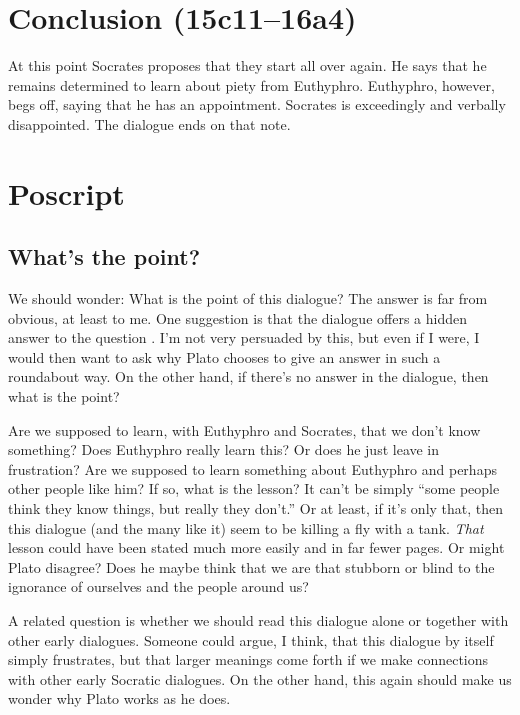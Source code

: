 \documentclass[11pt]{article}
\begin{document}
\section{Conclusion (15c11--16a4)}

At this point Socrates proposes that they start all over again.  He says that he remains determined to learn about piety from Euthyphro.  Euthyphro, however, begs off, saying that he has an appointment.  Socrates is exceedingly and verbally disappointed.  The dialogue ends on that note.


\section{Poscript}

\subsection{What's the point?}

We should wonder: What is the point of this dialogue?  The answer is far from obvious, at least to me.  One suggestion is that the dialogue offers a hidden answer to the question .  I'm not very persuaded by this, but even if I were, I would then want to ask why Plato chooses to give an answer in such a roundabout way.  On the other hand, if there's no answer in the dialogue, then what is the point?

Are we supposed to learn, with Euthyphro and Socrates, that we don't know something?  Does Euthyphro really learn this?  Or does he just leave in frustration?  Are we supposed to learn something about Euthyphro and perhaps other people like him?  If so, what is the lesson?  It can't be simply ``some people think they know things, but really they don't.''  Or at least, if it's only that, then this dialogue (and the many like it) seem to be killing a fly with a tank.  \emph{That} lesson could have been stated much more easily and in far fewer pages.  Or might Plato disagree?  Does he maybe think that we are that stubborn or blind to the ignorance of ourselves and the people around us?

A related question is whether we should read this dialogue alone or together with other early dialogues.  Someone could argue, I think, that this dialogue by itself simply frustrates, but that larger meanings come forth if we make connections with other early Socratic dialogues.  On the other hand, this again should make us wonder why Plato works as he does.
\end{document}
